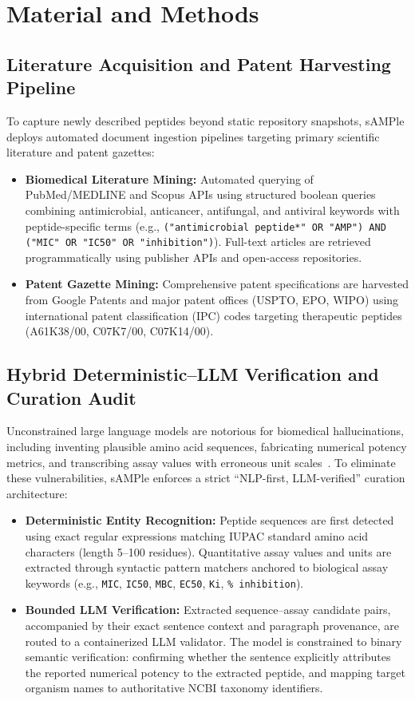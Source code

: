 \documentclass[unnumsec,webpdf,contemporary,large]{oup-authoring-template}%
\begin{document}
\section{Material and Methods}

\subsection{Literature Acquisition and Patent Harvesting Pipeline}

To capture newly described peptides beyond static repository snapshots, sAMPle deploys automated document ingestion pipelines targeting primary scientific literature and patent gazettes:
\begin{itemize}
    \item \textbf{Biomedical Literature Mining:} Automated querying of PubMed/MEDLINE and Scopus APIs using structured boolean queries combining antimicrobial, anticancer, antifungal, and antiviral keywords with peptide-specific terms (e.g., \texttt{("antimicrobial peptide*" OR "AMP") AND ("MIC" OR "IC50" OR "inhibition")}). Full-text articles are retrieved programmatically using publisher APIs and open-access repositories.
    \item \textbf{Patent Gazette Mining:} Comprehensive patent specifications are harvested from Google Patents and major patent offices (USPTO, EPO, WIPO) using international patent classification (IPC) codes targeting therapeutic peptides (A61K38/00, C07K7/00, C07K14/00).
\end{itemize}

\subsection{Hybrid Deterministic--LLM Verification and Curation Audit}

Unconstrained large language models are notorious for biomedical hallucinations, including inventing plausible amino acid sequences, fabricating numerical potency metrics, and transcribing assay values with erroneous unit scales~\cite{ji2023survey}. To eliminate these vulnerabilities, sAMPle enforces a strict ``NLP-first, LLM-verified'' curation architecture:
\begin{itemize}
    \item \textbf{Deterministic Entity Recognition:} Peptide sequences are first detected using exact regular expressions matching IUPAC standard amino acid characters (length 5--100 residues). Quantitative assay values and units are extracted through syntactic pattern matchers anchored to biological assay keywords (e.g., \texttt{MIC}, \texttt{IC50}, \texttt{MBC}, \texttt{EC50}, \texttt{Ki}, \texttt{\% inhibition}).
    \item \textbf{Bounded LLM Verification:} Extracted sequence--assay candidate pairs, accompanied by their exact sentence context and paragraph provenance, are routed to a containerized LLM validator. The model is constrained to binary semantic verification: confirming whether the sentence explicitly attributes the reported numerical potency to the extracted peptide, and mapping target organism names to authoritative NCBI taxonomy identifiers.
\end{itemize}
\end{document}
